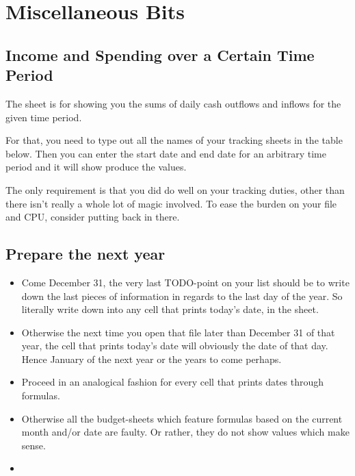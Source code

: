 \section{Miscellaneous Bits}
\label{sec:miscellaneous-bits}

\subsection{Income and Spending over a Certain Time Period}
\label{subsec:income-and-spending-certain-time-period}

The sheet  is for showing you the sums of daily cash outflows and inflows for the given time period.

For that, you need to type out all the names of your tracking sheets in the table below.
Then you can enter the start date and end date for an arbitrary time period and it will show produce the values.

The only requirement is that you did do well on your tracking duties, other than there isn't really a whole lot of magic involved.
To ease the burden on your file and CPU, consider putting  back in there.

\subsection{Prepare the next year}
\label{subsec:prepare-the-next-year}

\begin{itemize}
	\item Come December 31, the very last TODO-point on your list should be to write down the last pieces of information in regards to the last day of the year.
	So literally write down  into any cell that prints today's date, \eg in the  sheet.
	\item Otherwise the next time you open that file later than December 31 of that year, the cell that prints today's date will obviously the date of that day.
	Hence January of the next year or the years to come perhaps.
	\item Proceed in an analogical fashion for every cell that prints dates through formulas.
	\item Otherwise all the budget-sheets which feature formulas based on the current month and/or date are faulty.
	Or rather, they do not show values which make sense.
	\item 
\end{itemize}

